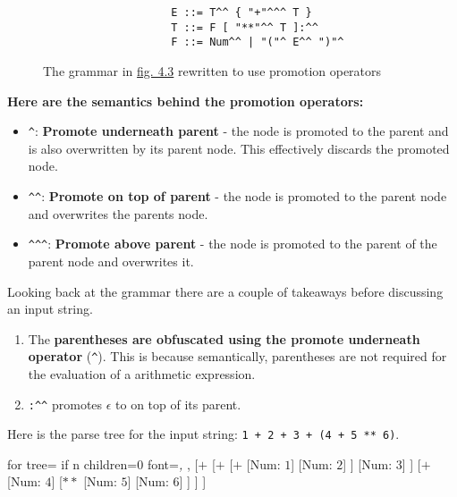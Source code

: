 \begin{figure}[H]
    \begin{center}
        \begin{verbatim}
                    E ::= T^^ { "+"^^^ T }
                    T ::= F [ "**"^^ T ]:^^
                    F ::= Num^^ | "("^ E^^ ")"^
        \end{verbatim}
    \end{center}
    \vspace{-1.5em}
    \caption{\label{fig:4.4}The grammar in \hyperref[fig:4.3]{fig. 4.3} rewritten to use promotion operators}
\end{figure}

\begin{center}
    \textbf{Here are the semantics behind the promotion operators:}
    \begin{itemize}
        \item \verb|^|: \textbf{Promote underneath parent} - the node is promoted to the parent and is also overwritten by its parent node. This effectively discards the promoted node.
        \item \verb|^^|: \textbf{Promote on top of parent} - the node is promoted to the parent node and overwrites the parents node.
        \item \verb|^^^|: \textbf{Promote above parent} - the node is promoted to the parent of the parent node and overwrites it.
    \end{itemize}
\end{center}

Looking back at the grammar there are a couple of takeaways before discussing an input string.

\begin{enumerate}
    \item The \textbf{parentheses are obfuscated using the promote underneath operator} (\verb|^|). This is because semantically, parentheses are not required for the evaluation of a arithmetic expression.
    \item \verb|:^^| promotes $\epsilon$ to on top of its parent.
\end{enumerate}


\begin{center}
    Here is the parse tree for the input string: \verb|1 + 2 + 3 + (4 + 5 ** 6)|.
    \begin{forest}
        for tree={
            if n children=0{
                font=\itshape,
            }{},
            }
            [$+$
                [$+$
                    [$+$
                        [Num: $1$]
                        [Num: $2$]
                    ]
                    [Num: $3$]
                ]
                [$+$
                    [Num: $4$]
                    [$**$
                        [Num: $5$]
                        [Num: $6$]
                    ]
                ]
            ]
    \end{forest}
\end{center}

